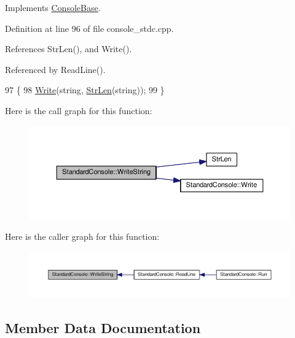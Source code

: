 Implements \hyperlink{classConsoleBase_a839801eeb5c25cd0a2cb13523e387bed}{Console\+Base}.



Definition at line 96 of file console\+\_\+stdc.\+cpp.



References Str\+Len(), and Write().



Referenced by Read\+Line().


\begin{DoxyCode}
97 \{
98     \hyperlink{classStandardConsole_a43844eb181d640c0e4860ef21c2e8fa7}{Write}(\textcolor{keywordtype}{string}, \hyperlink{clib_8h_a67ec56eb98b49515d35005a5b3bf9a32}{StrLen}(\textcolor{keywordtype}{string}));
99 \}
\end{DoxyCode}


Here is the call graph for this function\+:\nopagebreak
\begin{figure}[H]
\begin{center}
\leavevmode
\includegraphics[width=350pt]{classStandardConsole_a4357667b7d80d110aca730ccb1cdca13_cgraph}
\end{center}
\end{figure}




Here is the caller graph for this function\+:\nopagebreak
\begin{figure}[H]
\begin{center}
\leavevmode
\includegraphics[width=350pt]{classStandardConsole_a4357667b7d80d110aca730ccb1cdca13_icgraph}
\end{center}
\end{figure}




\subsection{Member Data Documentation}
